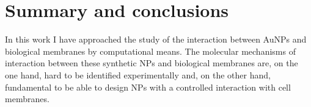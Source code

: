 \chapter{Summary and conclusions}
\label{chap:conclusions}
\begingroup
\toclesssection
\introductionStyle

%
%
In this work I have approached the study of the interaction between \acp{AuNP} and biological membranes by computational means. The molecular mechanisms of interaction between these synthetic \acp{NP} and biological membranes are, on the one hand, hard to be identified experimentally and, on the other hand, fundamental to be able to design \acp{NP} with a controlled interaction with cell membranes.

